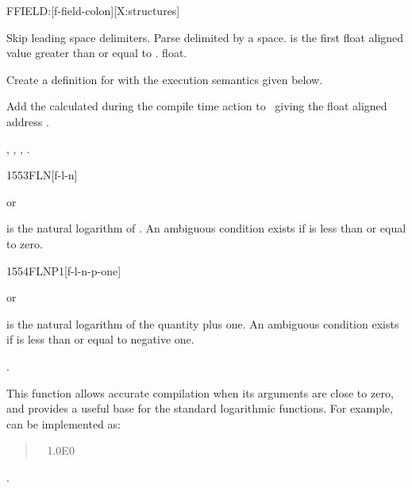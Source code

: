 
\begin{worddef}{}{FFIELD:}[f-field-colon][X:structures]
\item {}

	Skip leading space delimiters. Parse  delimited by
	a space.  is the first float aligned value greater
	than or equal to .   float.

	Create a definition for  with the execution semantics
	given below.

\execute[name]
\cbstart{}
\cbend

	Add the  calculated during the compile time action to
\cbstart{}\cbend\ 
	giving the float aligned address
\cbstart{}.\cbend

\see {},
	,
	, \linebreak
	.
\end{worddef}


\begin{worddef}{1553}{FLN}[f-l-n]
\item {} or

	 is the natural logarithm of . An ambiguous
	condition exists if \param{r_1} is less than or equal to zero.
\end{worddef}


\begin{worddef}{1554}{FLNP1}[f-l-n-p-one]
\item {} or

	 is the natural logarithm of the quantity 
	plus one. An ambiguous condition exists if \param{r_1} is less
	than or equal to negative one.

\see {}.

	\begin{rationale} %
		This function allows accurate compilation when its arguments
		are close to zero, and provides a useful base for the standard
		logarithmic functions. For example,  can be
		implemented as:

		\begin{quote}\ttfamily
			\word[core]{:}  ~
				1.0E0  ~ 
			\word[core]{;}
		\end{quote}
	\see {}.
	\end{rationale}
\end{worddef}


